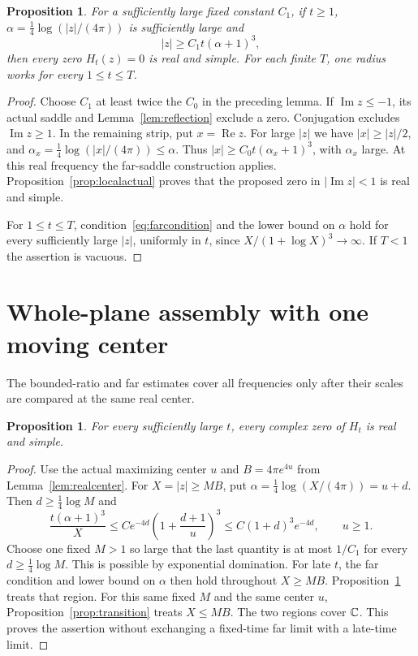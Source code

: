 \documentclass[11pt]{article}
\newtheorem{proposition}[theorem]{Proposition}
\theoremstyle{remark}\newtheorem{remark}[theorem]{Remark}
\DeclareMathOperator{\Rea}{Re}\DeclareMathOperator{\Ima}{Im}
\begin{document}
\begin{proposition}\label{prop:farzeros}
For a sufficiently large fixed constant $C_1$, if $t\geq1$,
$\alpha=\tfrac14\log(|z|/(4\pi))$ is sufficiently large and
\begin{equation}\label{eq:farcondition}
 |z|\geq C_1t(\alpha+1)^3,
\end{equation}
then every zero $H_t(z)=0$ is real and simple.
For each finite $T$, one radius works for every $1\leq t\leq T$.
\end{proposition}
\begin{proof}
Choose $C_1$ at least twice the $C_0$ in the preceding lemma.
If $\Ima z\leq-1$, its actual saddle and
Lemma~\ref{lem:reflection} exclude a zero.
Conjugation excludes $\Ima z\geq1$. In the remaining strip,
put $x=\Rea z$. For large $|z|$ we have
$|x|\geq|z|/2$, and
$\alpha_x=\tfrac14\log(|x|/(4\pi))\leq\alpha$.
Thus $|x|\geq C_0t(\alpha_x+1)^3$, with $\alpha_x$ large.
At this real frequency the far-saddle construction applies.
Proposition~\ref{prop:localactual} proves that the proposed
zero in $|\Ima z|<1$ is real and simple.

For $1\leq t\leq T$, condition~\eqref{eq:farcondition}
and the lower bound on $\alpha$ hold for every sufficiently
large $|z|$, uniformly in $t$, since
$X/(1+\log X)^3\to\infty$. If $T<1$ the assertion is vacuous.
\end{proof}

\section{Whole-plane assembly with one moving center}
The bounded-ratio and far estimates cover all frequencies
only after their scales are compared at the same real center.
\begin{proposition}\label{prop:eventual}
For every sufficiently large $t$, every complex zero of $H_t$
is real and simple.
\end{proposition}
\begin{proof}
Use the actual maximizing center $u$ and
$B=4\pi e^{4u}$ from Lemma~\ref{lem:realcenter}.
For $X=|z|\geq MB$, put
$\alpha=\tfrac14\log(X/(4\pi))=u+d$.
Then $d\geq\tfrac14\log M$ and
\[
 \frac{t(\alpha+1)^3}{X}
 \leq C e^{-4d}\left(1+\frac{d+1}{u}\right)^3
 \leq C(1+d)^3e^{-4d},\qquad u\geq1.
\]
Choose one fixed $M>1$ so large that the last quantity is
at most $1/C_1$ for every $d\geq\tfrac14\log M$.
This is possible by exponential domination.
For late $t$, the far condition and lower bound on $\alpha$
then hold throughout $X\geq MB$.
Proposition~\ref{prop:farzeros} treats that region.
For this same fixed $M$ and the same center $u$,
Proposition~\ref{prop:transition} treats $X\leq MB$.
The two regions cover $\mathbb C$. This proves the assertion without
exchanging a fixed-time far limit with a late-time limit.
\end{proof}
\end{document}
